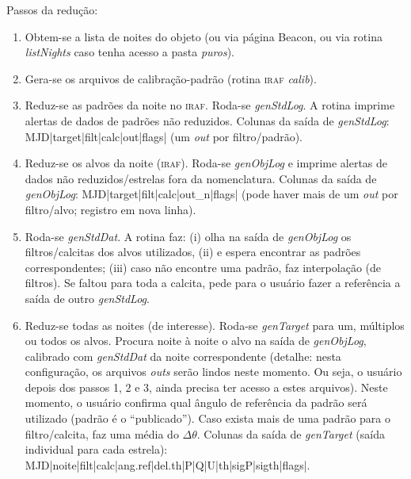 Passos da redução: 
\begin{enumerate}
    \item Obtem-se a lista de noites do objeto (ou via página Beacon, ou via
rotina \textit{listNights} caso tenha acesso a pasta \textit{puros}).
    \item Gera-se os arquivos de calibração-padrão (rotina \textsc{iraf}
\textit{calib}).
    \item Reduz-se as padrões da noite no \textsc{iraf}. Roda-se 
\textit{genStdLog}. A rotina imprime alertas
de dados de padrões não reduzidos. Colunas da saída de \textit{genStdLog}:
MJD|target|filt|calc|out|flags| (um \textit{out} por filtro/padrão). 
    \item Reduz-se os alvos da noite (\textsc{iraf}). Roda-se \textit{genObjLog}
 e imprime alertas de dados não reduzidos/estrelas fora da nomenclatura.
Colunas da saída de \textit{genObjLog}: MJD|target|filt|calc|out\_n|flags| (pode
 haver mais de um \textit{out} por filtro/alvo; registro em nova linha). 
    \item Roda-se \textit{genStdDat}.
A rotina faz: (i) olha na saída de \textit{genObjLog} os filtros/calcitas dos 
alvos utilizados, (ii) e espera encontrar as padrões
correspondentes; (iii) caso não encontre uma padrão, faz interpolação (de
filtros). Se faltou para toda a calcita, pede para o usuário fazer a
 referência a saída de outro \textit{genStdLog}.

    \item Reduz-se todas as noites (de interesse). Roda-se
\textit{genTarget} para um, múltiplos ou todos os alvos. Procura noite à noite
o alvo na saída de \textit{genObjLog}, calibrado com \textit{genStdDat} da
noite correspondente (detalhe: nesta configuração, os arquivos \textit{outs}
serão lindos neste momento. Ou seja, o usuário depois dos passos 1, 2 e 3, ainda
 precisa ter acesso a estes arquivos). Neste momento, o usuário confirma qual
ângulo de
referência da padrão será utilizado (padrão é o ``publicado''). Caso exista
mais de uma padrão para o filtro/calcita, faz uma média do $\Delta\theta$.
Colunas da saída de \textit{genTarget} (saída individual para cada estrela):
\newline MJD|noite|filt|calc|ang.ref|del.th|P|Q|U|th|sigP|sigth|flags|.
\end{enumerate}
    
